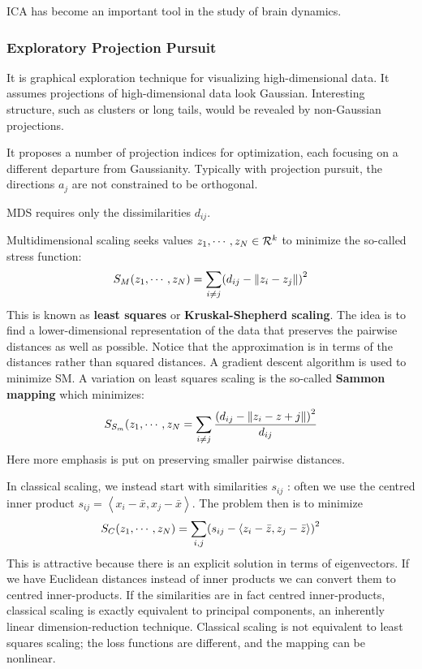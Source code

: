 ICA has become an important tool in the study of brain dynamics.

\subsubsection{Exploratory Projection Pursuit}
It is graphical exploration technique for visualizing high-dimensional data. It assumes projections of high-dimensional data look Gaussian. Interesting structure, such as clusters or long tails, would be revealed by non-Gaussian projections.

It proposes a number of projection indices for optimization, each focusing on a different departure from Gaussianity. Typically with projection pursuit, the directions $a_j$ are not constrained to be orthogonal.

MDS requires only the dissimilarities $d_{ij}$.

Multidimensional scaling seeks values $z_1, \cdots , z_N \in \CMcal{R}^k$ to minimize the so-called stress function:
\begin{equation}
S_M(z_1, \cdots, z_N) = \sum_{i\ne j}\br{d_{ij}- \| z_i - z_j \|}^2
\end{equation}
This is known as \textbf{least squares} or \textbf{Kruskal-Shepherd scaling}. The idea is to find a lower-dimensional representation of the data that preserves the pairwise distances as well as possible. Notice that the approximation is in terms of the distances rather than squared distances. A gradient descent algorithm is used to minimize SM.
A variation on least squares scaling is the so-called \textbf{Sammon mapping} which minimizes:
\begin{equation}
S_{S_m}(z_1, \cdots, z_N = \sum_{i\ne j}\frac{\left(d_{ij} - \|z_i - z+j\|\right)^2}{d_{ij}}
\end{equation}
Here more emphasis is put on preserving smaller pairwise distances.

In classical scaling, we instead start with similarities $s_{ij}$ : often we use the centred inner product $s_{ij} = \left\langle x_i - \bar{x} , x_j - \bar{x}\right\rangle$. The problem then is to minimize
\begin{equation}
S_C(z_1, \cdots, z_N) = \sum_{i,j} \br{s_{ij} - \left\langle z_i-\bar{z}, z_j - \bar{z}\right\rangle}^2
\end{equation}
This is attractive because there is an explicit solution in terms of eigenvectors. If we have Euclidean distances instead of inner products we can convert them to centred inner-products. If the similarities are in fact centred inner-products, classical scaling is exactly equivalent to principal components, an inherently linear dimension-reduction technique. Classical scaling is not equivalent to least squares scaling; the loss functions are different, and the mapping can be nonlinear.

